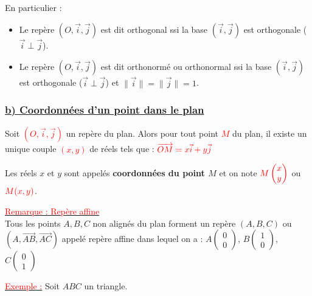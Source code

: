 \documentclass[12pt,a4paper]{article}
\begin{document}
\vspace{0.2cm}

{\color{red} En particulier :}
\begin{itemize}
    \item[\color{red} i)] Le repère {\color{red}$(O, \vec{i}, \vec{j})$} est dit orthogonal ssi la base {\color{red}$(\vec{i}, \vec{j})$} est orthogonale ({\color{red}$\vec{i} \perp \vec{j}$}).
    \item[\color{red} ii)] Le repère {\color{red}$(O, \vec{i}, \vec{j})$} est dit orthonormé ou orthonormal ssi la base {\color{red}$(\vec{i}, \vec{j})$} est orthogonale ({\color{red}$\vec{i} \perp \vec{j}$}) et {\color{red}$\|\vec{i}\| = \|\vec{j}\| = 1$}.
\end{itemize}

\subsubsection*{\centering \underline{\color{red} b) Coordonnées d'un point dans le plan}}


Soit \textcolor{red}{$(O, \vec{i}, \vec{j})$} un repère du plan. Alors pour tout point \textcolor{red}{$M$} du plan, il existe un unique couple \textcolor{red}{$(x, y)$} de réels tels que :
\(
\color{red}{\overrightarrow{OM} = x\vec{i} + y\vec{j}}
\)

Les réels $x$ et $y$ sont appelés \textbf{coordonnées du point $M$} et on note $\color{red}{M \begin{pmatrix} x \\ y \end{pmatrix}}$ ou $\color{red}{M(x, y)}$.

\noindent \underline{\textcolor{red}{Remarque : Repère affine}} \\
Tous les points $A, B, C$ non alignés du plan forment un repère $(A, B, C)$ ou $(A, \overrightarrow{AB}, \overrightarrow{AC})$ appelé repère affine dans lequel on a : 
$A \begin{pmatrix} 0 \\ 0 \end{pmatrix}$, $B \begin{pmatrix} 1 \\ 0 \end{pmatrix}$, $C \begin{pmatrix} 0 \\ 1 \end{pmatrix}$

\noindent \underline{\textcolor{red}{Exemple :}} Soit $ABC$ un triangle.
\end{document}
